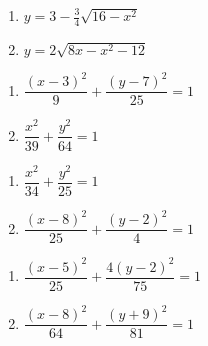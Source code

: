 \begin{multicols}{2}
\begin{enumerate}
\setcounter{enumi}{\value{HW}}

\item $y = 3 - \frac{3}{4} \sqrt{16-x^2}$

\item  $y = 2 \sqrt{8x-x^2-12}$ 

\setcounter{HW}{\value{enumi}}
\end{enumerate}
\end{multicols}

\begin{multicols}{2}
\begin{enumerate}
\setcounter{enumi}{\value{HW}}

\item $\dfrac{(x - 3)^{2}}{9} + \dfrac{(y - 7)^{2}}{25} = 1$
\item $\dfrac{x^{2}}{39} + \dfrac{y^{2}}{64} = 1$


\setcounter{HW}{\value{enumi}}
\end{enumerate}
\end{multicols}



\begin{multicols}{2}
\begin{enumerate}
\setcounter{enumi}{\value{HW}}

\item $\dfrac{x^{2}}{34} + \dfrac{y^{2}}{25} = 1$
\item $\dfrac{(x - 8)^{2}}{25} + \dfrac{(y - 2)^{2}}{4} = 1$

\setcounter{HW}{\value{enumi}}
\end{enumerate}
\end{multicols}

\begin{multicols}{2}
\begin{enumerate}
\setcounter{enumi}{\value{HW}}

\item $\dfrac{(x-5)^{2}}{25} + \dfrac{4(y-2)^{2}}{75} = 1$
\item $\dfrac{(x - 8)^{2}}{64} + \dfrac{(y + 9)^{2}}{81} = 1$

\setcounter{HW}{\value{enumi}}
\end{enumerate}
\end{multicols}

